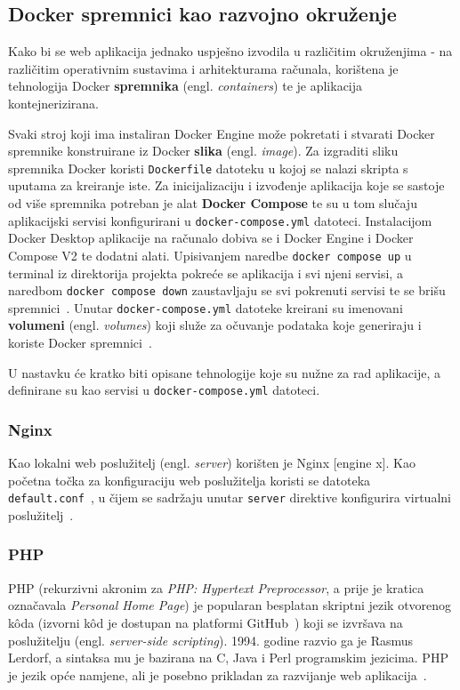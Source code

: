 \subsection{Docker spremnici kao razvojno okruženje}

Kako bi se web aplikacija jednako uspješno izvodila u različitim okruženjima - na različitim operativnim sustavima i arhitekturama računala, korištena je tehnologija Docker \textbf{spremnika} (engl. \textit{containers}) te je aplikacija kontejnerizirana.

Svaki stroj koji ima instaliran Docker Engine može pokretati i stvarati Docker spremnike konstruirane iz Docker \textbf{slika} (engl. \textit{image}). Za izgraditi sliku spremnika Docker koristi \texttt{Dockerfile} datoteku u kojoj se nalazi skripta s uputama za kreiranje iste. Za inicijalizaciju i izvođenje aplikacija koje se sastoje od više spremnika potreban je alat \textbf{Docker Compose} te su u tom slučaju aplikacijski servisi konfigurirani u \texttt{docker-compose.yml} datoteci. Instalacijom Docker Desktop aplikacije na računalo dobiva se i Docker Engine i Docker Compose V2 te dodatni alati. Upisivanjem naredbe \texttt{docker compose up} u terminal iz direktorija projekta pokreće se aplikacija i svi njeni servisi, a naredbom \texttt{docker compose down} zaustavljaju se svi pokrenuti servisi te se brišu spremnici~\cite{dockerCompose}. Unutar \texttt{docker-compose.yml} datoteke kreirani su imenovani \textbf{volumeni} (engl. \textit{volumes}) koji služe za očuvanje podataka koje generiraju i koriste Docker spremnici~\cite{dockerVolumes}.

U nastavku će kratko biti opisane tehnologije koje su nužne za rad aplikacije, a definirane su kao servisi u \texttt{docker-compose.yml} datoteci.

\subsubsection{Nginx}
Kao lokalni web poslužitelj (engl. \textit{server}) korišten je Nginx [engine x]. Kao početna točka za konfiguraciju web poslužitelja koristi se datoteka \texttt{default.conf}~\cite{nginxDeployment}, u čijem se sadržaju unutar \texttt{server} direktive konfigurira virtualni poslužitelj~\cite{nginxServer}.

\subsubsection{PHP}
PHP (rekurzivni akronim za  \textit{PHP: Hypertext Preprocessor}, a prije je kratica označavala \textit{Personal Home Page}) je popularan besplatan skriptni jezik otvorenog k\^oda (izvorni k\^od je dostupan na platformi GitHub~\cite{phpGitHub}) koji se izvršava na poslužitelju (engl. \textit{server-side scripting}). 1994. godine razvio ga je  Rasmus Lerdorf, a sintaksa mu je bazirana na C, Java i Perl programskim jezicima. PHP je jezik opće namjene, ali je posebno prikladan za razvijanje web aplikacija~\cite{Brekalo}.

